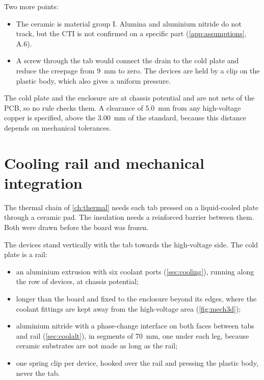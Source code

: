 Two more points:
\begin{itemize}
  \item The ceramic is material group I. Alumina and aluminium nitride do not
        track, but the CTI is not confirmed on a specific part
        (\cref{app:assumptions}, A.6).
  \item A screw through the tab would connect the drain to the cold plate and
        reduce the creepage from \SI{9}{\milli\metre} to zero. The devices
        are held by a clip on the plastic body, which also gives a uniform
        pressure.
\end{itemize}

The cold plate and the enclosure are at chassis potential and are not nets of
the PCB, so no rule checks them. A clearance of \SI{5.0}{\milli\metre} from
any high-voltage copper is specified, above the \SI{3.00}{\milli\metre} of
the standard, because this distance depends on mechanical tolerances.

\section{Cooling rail and mechanical integration}
\label{sec:mechanics}

The thermal chain of \cref{ch:thermal} needs each tab pressed on a
liquid-cooled plate through a ceramic pad. The insulation needs a reinforced
barrier between them. Both were drawn before the board was frozen.

The devices stand vertically with the tab towards the high-voltage side.
The cold plate is a rail:
\begin{itemize}
  \item an aluminium extrusion with six coolant ports (\cref{sec:cooling}),
        running along the row of devices, at chassis potential;
  \item longer than the board and fixed to the enclosure beyond its edges,
        where the coolant fittings are kept away from the high-voltage area
        (\cref{fig:mech3d});
  \item aluminium nitride with a phase-change interface on both faces
        between tabs and rail (\cref{sec:coolalt}), in segments of
        \SI{70}{\milli\metre}, one under each leg, because ceramic
        substrates are not made as long as the rail;
  \item one spring clip per device, hooked over the rail and pressing the
        plastic body, never the tab.
\end{itemize}

